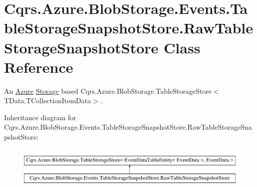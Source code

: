 \hypertarget{classCqrs_1_1Azure_1_1BlobStorage_1_1Events_1_1TableStorageSnapshotStore_1_1RawTableStorageSnapshotStore}{}\section{Cqrs.\+Azure.\+Blob\+Storage.\+Events.\+Table\+Storage\+Snapshot\+Store.\+Raw\+Table\+Storage\+Snapshot\+Store Class Reference}
\label{classCqrs_1_1Azure_1_1BlobStorage_1_1Events_1_1TableStorageSnapshotStore_1_1RawTableStorageSnapshotStore}


An \hyperlink{namespaceCqrs_1_1Azure}{Azure} \hyperlink{namespaceCqrs_1_1Azure_1_1Storage}{Storage} based Cqrs.\+Azure.\+Blob\+Storage.\+Table\+Storage\+Store$<$\+T\+Data,\+T\+Collection\+Item\+Data$>$.  


Inheritance diagram for Cqrs.\+Azure.\+Blob\+Storage.\+Events.\+Table\+Storage\+Snapshot\+Store.\+Raw\+Table\+Storage\+Snapshot\+Store\+:\begin{figure}[H]
\begin{center}
\leavevmode
\includegraphics[height=2.000000cm]{classCqrs_1_1Azure_1_1BlobStorage_1_1Events_1_1TableStorageSnapshotStore_1_1RawTableStorageSnapshotStore}
\end{center}
\end{figure}
